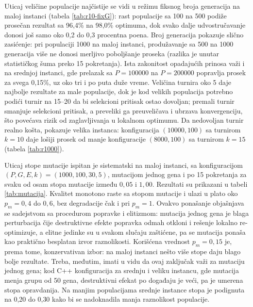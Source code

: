 \documentclass[12pt]{article}
\begin{document}
Uticaj veličine populacije najčistije se vidi u režimu fiksnog broja generacija na maloj instanci (tabela \ref{tab:r10-fixG}): rast populacije sa 100 na 500 podiže prosečan rezultat sa 96{,}4\% na 98{,}0\% optimuma, dok svako dalje udvostručavanje donosi još samo oko 0{,}2 do 0{,}3 procentna poena. Broj generacija pokazuje slično zasićenje: pri populaciji 1000 na maloj instanci, produžavanje sa 500 na 1000 generacija više ne donosi merljivo poboljšanje proseka (razlika je unutar statističkog šuma preko 15 pokretanja). Ista zakonitost opadajućih prinosa važi i na srednjoj instanci, gde prelazak sa $P = 100000$ na $P = 200000$ popravlja prosek za svega 0{,}15\%, uz oko tri i po puta duže vreme. Veličina turnira oko 5 daje najbolje rezultate za male populacije, dok je kod velikih populacija potrebno podići turnir na 15--20 da bi selekcioni pritisak ostao dovoljan; premali turnir smanjuje selekcioni pritisak, a preveliki ga preuveličava i ubrzava konvergenciju, što povećava rizik od zaglavljivanja u lokalnom optimumu. Da nedovoljan turnir realno košta, pokazuje velika instanca: konfiguracija $(10000, 100)$ sa turnirom $k = 10$ daje lošiji prosek od manje konfiguracije $(8000, 100)$ sa turnirom $k = 15$ (tabela \ref{tab:r1000}).

Uticaj stope mutacije ispitan je sistematski na maloj instanci, sa konfiguracijom $(P, G, E, k) = (1000, 100, 30, 5)$, mutacijom jednog gena i po 15 pokretanja za svaku od osam stopa mutacije između $0{,}05$ i $1{,}00$. Rezultati su prikazani u tabeli \ref{tab:mutacija}. Kvalitet monotono raste sa stopom mutacije i ulazi u plato oko $p_m = 0{,}4$ do $0{,}6$, bez degradacije čak i pri $p_m = 1$. Ovakvo ponašanje objašnjava se sadejstvom sa procedurom popravke i elitizmom: mutacija jednog gena je blaga perturbacija čije destruktivne efekte popravka odmah otkloni i rešenje lokalno re-optimizuje, a elitne jedinke su u svakom slučaju zaštićene, pa se mutacija ponaša kao praktično besplatan izvor raznolikosti. Korišćena vrednost $p_m = 0{,}15$ je, prema tome, konzervativan izbor: na maloj instanci nešto više stope daju blago bolje rezultate. Treba, međutim, imati u vidu da ovaj zaključak važi za mutaciju jednog gena; kod C++ konfiguracija za srednju i veliku instancu, gde mutacija menja grupu od 50 gena, destruktivni efekat po događaju je veći, pa je umerena stopa opravdanija. Na manjim populacijama srednje instance stopa je podignuta na 0{,}20 do 0{,}30 kako bi se nadoknadila manja raznolikost populacije.
\end{document}
